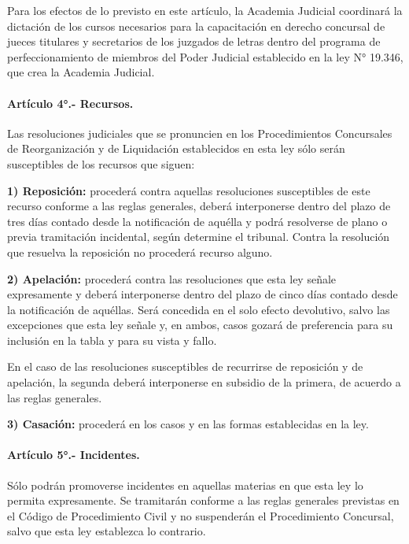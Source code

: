 \documentclass[
]{book}
\begin{document}
Para los efectos de lo previsto en este artículo, la Academia Judicial coordinará la dictación de los cursos necesarios para la capacitación en derecho concursal de jueces titulares y secretarios de los juzgados de letras dentro del programa de perfeccionamiento de miembros del Poder Judicial establecido en la ley N° 19.346, que crea la Academia Judicial.

\hypertarget{artuxedculo-4.--recursos.}{%
\paragraph*{Artículo 4°.- Recursos.}\label{artuxedculo-4.--recursos.}}

Las resoluciones judiciales que se pronuncien en los Procedimientos Concursales de Reorganización y de Liquidación establecidos en esta ley sólo serán susceptibles de los recursos que siguen:

\textbf{1) Reposición:} procederá contra aquellas resoluciones susceptibles de este recurso conforme a las reglas generales, deberá interponerse dentro del plazo de tres días contado desde la notificación de aquélla y podrá resolverse de plano o previa tramitación incidental, según determine el tribunal. Contra la resolución que resuelva la reposición no procederá recurso alguno.

\textbf{2) Apelación:} procederá contra las resoluciones que esta ley señale expresamente y deberá interponerse dentro del plazo de cinco días contado desde la notificación de aquéllas. Será concedida en el solo efecto devolutivo, salvo las excepciones que esta ley señale y, en ambos, casos gozará de preferencia para su inclusión en la tabla y para su vista y fallo.

En el caso de las resoluciones susceptibles de recurrirse de reposición y de apelación, la segunda deberá interponerse en subsidio de la primera, de acuerdo a las reglas generales.

\textbf{3) Casación:} procederá en los casos y en las formas establecidas en la ley.

\hypertarget{artuxedculo-5.--incidentes.}{%
\paragraph*{Artículo 5°.- Incidentes.}\label{artuxedculo-5.--incidentes.}}

Sólo podrán promoverse incidentes en aquellas materias en que esta ley lo permita expresamente. Se tramitarán conforme a las reglas generales previstas en el Código de Procedimiento Civil y no suspenderán el Procedimiento Concursal, salvo que esta ley establezca lo contrario.
\end{document}
